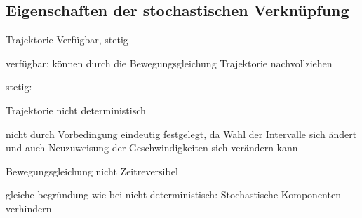 \documentclass[twocolumn]{article}
\let\tempone\itemize
\let\temptwo\enditemize
\renewenvironment{itemize}{\tempone\addtolength{\itemsep}{-.5\baselineskip}}{\temptwo}
\begin{document}
\subsection{Eigenschaften der stochastischen Verknüpfung}
	\begin{itemize}
		\item Trajektorie Verfügbar, stetig
		\begin{itemize}
			\item verfügbar: können durch die Bewegungsgleichung Trajektorie nachvollziehen
			\item stetig: %
		\end{itemize}
		\item Trajektorie nicht deterministisch
		\begin{itemize}
			\item nicht durch Vorbedingung eindeutig festgelegt, da Wahl der Intervalle sich ändert und auch Neuzuweisung der Geschwindigkeiten sich verändern kann
		\end{itemize}
		\item Bewegungsgleichung nicht Zeitreversibel 
		\begin{itemize}
			\item gleiche begründung wie bei nicht deterministisch: Stochastische Komponenten verhindern
		\end{itemize}		
	\end{itemize}
	
\end{document}
